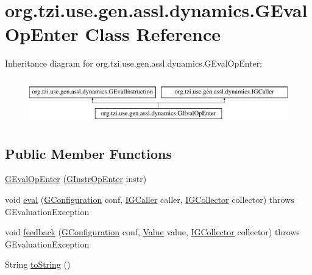 \hypertarget{classorg_1_1tzi_1_1use_1_1gen_1_1assl_1_1dynamics_1_1_g_eval_op_enter}{\section{org.\-tzi.\-use.\-gen.\-assl.\-dynamics.\-G\-Eval\-Op\-Enter Class Reference}
\label{classorg_1_1tzi_1_1use_1_1gen_1_1assl_1_1dynamics_1_1_g_eval_op_enter}
}
Inheritance diagram for org.\-tzi.\-use.\-gen.\-assl.\-dynamics.\-G\-Eval\-Op\-Enter\-:\begin{figure}[H]
\begin{center}
\leavevmode
\includegraphics[height=1.978799cm]{classorg_1_1tzi_1_1use_1_1gen_1_1assl_1_1dynamics_1_1_g_eval_op_enter}
\end{center}
\end{figure}
\subsection*{Public Member Functions}
\begin{DoxyCompactItemize}
\item 
\hyperlink{classorg_1_1tzi_1_1use_1_1gen_1_1assl_1_1dynamics_1_1_g_eval_op_enter_a49d2fc9062fbdac17203943b9423dd05}{G\-Eval\-Op\-Enter} (\hyperlink{classorg_1_1tzi_1_1use_1_1gen_1_1assl_1_1statics_1_1_g_instr_op_enter}{G\-Instr\-Op\-Enter} instr)
\item 
void \hyperlink{classorg_1_1tzi_1_1use_1_1gen_1_1assl_1_1dynamics_1_1_g_eval_op_enter_aed9caaa41a58c17da379e2c6df2915de}{eval} (\hyperlink{classorg_1_1tzi_1_1use_1_1gen_1_1assl_1_1dynamics_1_1_g_configuration}{G\-Configuration} conf, \hyperlink{interfaceorg_1_1tzi_1_1use_1_1gen_1_1assl_1_1dynamics_1_1_i_g_caller}{I\-G\-Caller} caller, \hyperlink{interfaceorg_1_1tzi_1_1use_1_1gen_1_1assl_1_1dynamics_1_1_i_g_collector}{I\-G\-Collector} collector)  throws G\-Evaluation\-Exception 
\item 
void \hyperlink{classorg_1_1tzi_1_1use_1_1gen_1_1assl_1_1dynamics_1_1_g_eval_op_enter_a84a632d3f3d793b7ef2637e85ed3a0d2}{feedback} (\hyperlink{classorg_1_1tzi_1_1use_1_1gen_1_1assl_1_1dynamics_1_1_g_configuration}{G\-Configuration} conf, \hyperlink{classorg_1_1tzi_1_1use_1_1uml_1_1ocl_1_1value_1_1_value}{Value} value, \hyperlink{interfaceorg_1_1tzi_1_1use_1_1gen_1_1assl_1_1dynamics_1_1_i_g_collector}{I\-G\-Collector} collector)  throws G\-Evaluation\-Exception 
\item 
String \hyperlink{classorg_1_1tzi_1_1use_1_1gen_1_1assl_1_1dynamics_1_1_g_eval_op_enter_a2a4a5d79e092dc6a6d47018846e4ad95}{to\-String} ()
\end{DoxyCompactItemize}
